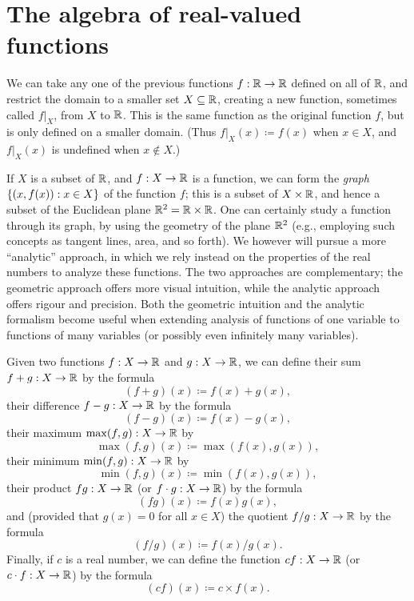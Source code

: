 \section{The algebra of real-valued functions}\label{i:sec:9.2}

\begin{note}
  We can take any one of the previous functions \(f : \mathbb{R} \to \mathbb{R}\) defined on all of \(\mathbb{R}\), and restrict the domain to a smaller set \(X \subseteq \mathbb{R}\), creating a new function, sometimes called \(f|_X\), from \(X\) to \(\mathbb{R}\).
  This is the same function as the original function \(f\), but is only defined on a smaller domain.
  (Thus \(f|_X(x) \coloneqq f(x)\) when \(x \in X\), and \(f|_X(x)\) is undefined when \(x \notin X\).)
\end{note}

\begin{note}
  If \(X\) is a subset of \(\mathbb{R}\), and \(f : X \to \mathbb{R}\) is a function, we can form the \emph{graph} \(\left\lbrace(x, f(x)) : x \in X\right\rbrace\) of the function \(f\);
  this is a subset of \(X \times \mathbb{R}\), and hence a subset of the Euclidean plane \(\mathbb{R}^2 = \mathbb{R} \times \mathbb{R}\).
  One can certainly study a function through its graph, by using the geometry of the plane \(\mathbb{R}^2\)
  (e.g., employing such concepts as tangent lines, area, and so forth).
  We however will pursue a more ``analytic'' approach, in which we rely instead on the properties of the real numbers to analyze these functions.
  The two approaches are complementary;
  the geometric approach offers more visual intuition, while the analytic approach offers rigour and precision.
  Both the geometric intuition and the analytic formalism become useful when extending analysis of functions of one variable to functions of many variables
  (or possibly even infinitely many variables).
\end{note}

\begin{defn}\label{i:9.2.1}
  Given two functions \(f : X \to \mathbb{R}\) and \(g : X \to \mathbb{R}\), we can define their sum \(f + g : X \to \mathbb{R}\) by the formula
  \[
    (f + g)(x) \coloneqq f(x) + g(x),
  \]
  their difference \(f - g : X \to \mathbb{R}\) by the formula
  \[
    (f - g)(x) \coloneqq f(x) - g(x),
  \]
  their maximum \(\max(f, g) : X \to \mathbb{R}\) by
  \[
    \max(f, g)(x) \coloneqq \max(f(x), g(x)),
  \]
  their minimum \(\min(f, g) : X \to \mathbb{R}\) by
  \[
    \min(f, g)(x) \coloneqq \min(f(x), g(x)),
  \]
  their product \(fg : X \to \mathbb{R}\) (or \(f \cdot g : X \to \mathbb{R}\)) by the formula
  \[
    (fg)(x) \coloneqq f(x)g(x),
  \]
  and (provided that \(g(x) = 0\) for all \(x \in X\)) the quotient \(f / g : X \to \mathbb{R}\) by the formula
  \[
    (f / g)(x) \coloneqq f(x) / g(x).
  \]
  Finally, if \(c\) is a real number, we can define the function \(cf : X \to \mathbb{R}\) (or \(c \cdot f : X \to \mathbb{R}\)) by the formula
  \[
    (cf)(x) \coloneqq c \times f(x).
  \]
\end{defn}

